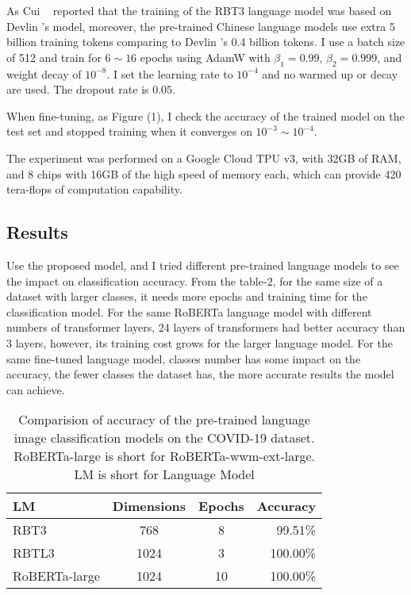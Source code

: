 \documentclass[review]{cvpr}
\begin{document}
As Cui \etal~\cite{cui2020revisiting} reported that the training of the RBT3 language model was based on Devlin \etal's model,
moreover, the pre-trained Chinese language models use extra 5 billion training tokens comparing to Devlin \etal's 0.4 billion tokens.
I use a batch size of 512 and train for $6\sim16$ epochs using AdamW with $\beta_1=0.99$, $\beta_2=0.999$, and weight decay of $10^{-8}$.
I set the learning rate to $10^{-4}$ and no warmed up or decay are used.
The dropout rate is $0.05$.

\par When fine-tuning, as Figure (1), I check the accuracy of the trained model on the test set and stopped training when it converges on $10^{-3}\sim10^{-4}$.

\par The experiment was performed on a Google Cloud TPU v3, with 32GB of RAM, and 8 chips with 16GB of the high speed of memory each,
which can provide 420 tera-flops of computation capability.

\subsection{Results}

Use the proposed model, and I tried different pre-trained language models to see the impact on classification accuracy.
From the table-2, for the same size of a dataset with larger classes, it needs more epochs and training time for the classification model.
For the same RoBERTa language model with different numbers of transformer layers, 24 layers of transformers had better accuracy than 3 layers,
however, its training cost grows for the larger language model.
For the same fine-tuned language model, classes number has some impact on the accuracy,
the fewer classes the dataset has, the more accurate results the model can achieve.


\begin{table}
\begin{center}
\begin{tabular}{|l|c|c|r|}
\hline
LM& Dimensions & Epochs & Accuracy \\
\hline\hline
RBT3   & 768 & 8	&	99.51\% \\
RBTL3  & 1024 & 3	&	100.00\% \\
RoBERTa-large  & 1024  & 10	&	100.00\% \\
\hline
\end{tabular}
\end{center}
\caption{Comparision of accuracy of the pre-trained language image classification models on the COVID-19 dataset.
RoBERTa-large is short for RoBERTa-wwm-ext-large. LM is short for Language Model}
\end{table}
\end{document}
